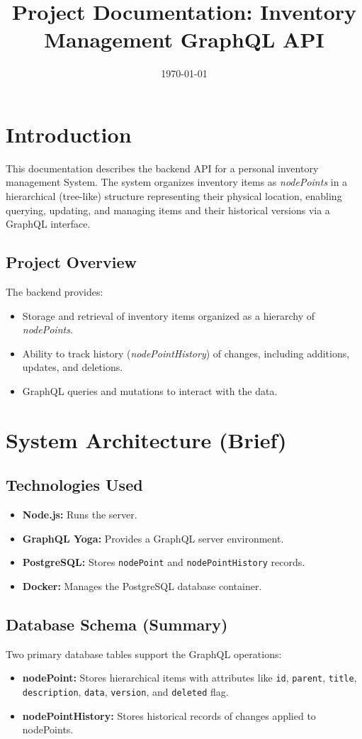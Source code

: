 \documentclass[12pt,a4paper]{article}
\title{Project Documentation: Inventory Management GraphQL API}
\date{\today}
\begin{document}
\maketitle

\tableofcontents

\section{Introduction}
This documentation describes the backend API for a personal inventory management System. The system organizes inventory
items as \textit{nodePoints} in a hierarchical (tree-like) structure representing their physical location, enabling querying, updating, and managing items and their historical versions via a GraphQL interface.

\subsection{Project Overview}
The backend provides:
\begin{itemize}
    \item Storage and retrieval of inventory items organized as a hierarchy of \textit{nodePoints}.
    \item Ability to track history (\textit{nodePointHistory}) of changes, including additions, updates, and deletions.
    \item GraphQL queries and mutations to interact with the data.
\end{itemize}

\section{System Architecture (Brief)}
\subsection{Technologies Used}
\begin{itemize}
    \item \textbf{Node.js:} Runs the server.
    \item \textbf{GraphQL Yoga:} Provides a GraphQL server environment.
    \item \textbf{PostgreSQL:} Stores \texttt{nodePoint} and \texttt{nodePointHistory} records.
    \item \textbf{Docker:} Manages the PostgreSQL database container.
\end{itemize}

\subsection{Database Schema (Summary)}
Two primary database tables support the GraphQL operations:
\begin{itemize}
    \item \textbf{nodePoint:} Stores hierarchical items with attributes like \texttt{id}, \texttt{parent}, \texttt{title}, \texttt{description}, \texttt{data}, \texttt{version}, and \texttt{deleted} flag.
    \item \textbf{nodePointHistory:} Stores historical records of changes applied to nodePoints.
\end{itemize}
\end{document}
